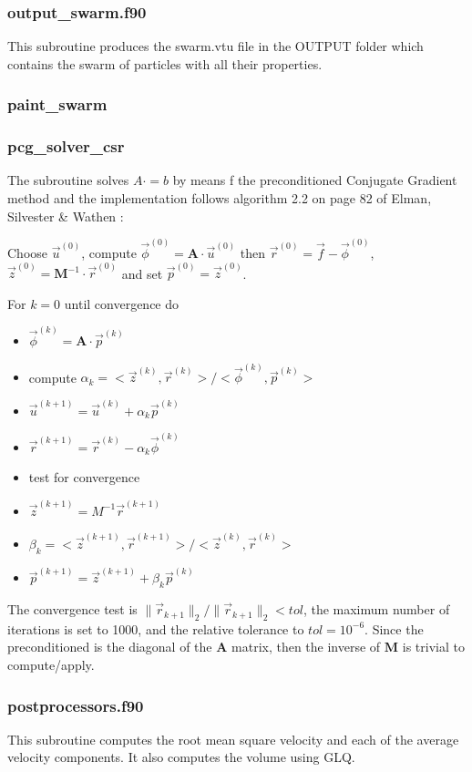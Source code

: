  \subsubsection{output\_swarm.f90}
 This subroutine produces the {\filenamefont swarm.vtu} file in the 
 {\foldernamefont OUTPUT} folder which contains the 
 swarm of particles with all their properties.
 \subsubsection{paint\_swarm}
 
 \subsubsection{pcg\_solver\_csr}
 The subroutine solves $A\cdot = b$ by means f the preconditioned Conjugate Gradient method
 and the implementation follows algorithm 2.2 on page 82 of Elman, Silvester \&
 Wathen \cite{elsw}:
 
 Choose ${\vec u}^{(0)}$, compute ${\vec \phi}^{(0)}={\bm A}\cdot {\vec u}^{(0)}$ 
 then ${\vec r}^{(0)}={\vec f}-{\vec \phi}^{(0)}$, 
 ${\vec z}^{(0)}={\bm M}^{-1}\cdot {\vec r}^{(0)}$ and set ${\vec p}^{(0)}={\vec z}^{(0)}$.
 
 For $k=0$ until convergence do
 \begin{itemize}
 \item ${\vec \phi}^{(k)}={\bm A}\cdot {\vec p}^{(k)}$
 \item compute $\alpha_k = <{\vec z}^{(k)},{\vec r}^{(k)}>/<{\vec \phi}^{(k)},{\vec p}^{(k)}>$
 \item ${\vec u}^{(k+1)}={\vec u}^{(k)}+\alpha_k {\vec p}^{(k)}$
 \item ${\vec r}^{(k+1)}={\vec r}^{(k)}-\alpha_k{\vec \phi}^{(k)}$
 \item test for convergence
 \item ${\vec z}^{(k+1)}=M^{-1} {\vec r}^{(k+1)}$
 \item $\beta_k= <{\vec z}^{(k+1)},{\vec r}^{(k+1)}>/<{\vec z}^{(k)},{\vec r}^{(k)}>$
 \item ${\vec p}^{(k+1)}={\vec z}^{(k+1)}+\beta_k {\vec p}^{(k)}$
 \end{itemize}
 The convergence test is $\| \vec{r}_{k+1} \|_2/ \| \vec{r}_{k+1} \|_2 < tol$, 
 the maximum number of iterations is set to 1000, and the relative tolerance to $tol=10^{-6}$.
 Since the preconditioned is the diagonal of the ${\bm A}$ matrix, then the inverse of 
 ${\bm M}$ is trivial to compute/apply. 
 \subsubsection{postprocessors.f90}
 This subroutine computes the root mean square velocity
 and each of the average velocity components. It also 
 computes the volume using GLQ.
